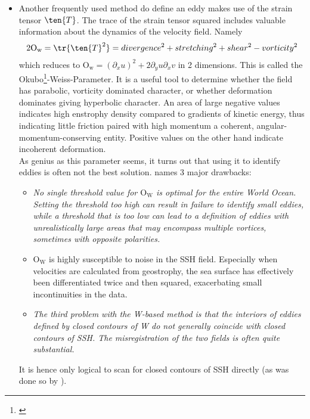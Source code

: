 \begin{itemize}
\item
Another frequently used method do define an eddy makes use of the strain tensor $\ten{T}$. The trace of the strain tensor squared includes
valuable information about the dynamics of the velocity field. Namely
\begin{equation}\begin{split}
	2\mathrm{O_w}=\tr{\ten{T}^2}
	=
	divergence^2
	+ stretching^2
	+ shear^2
	 - vorticity^2 \\
\end{split}\end{equation}
which reduces to $\mathrm{O_w}= \left(\partial_x u\right)^2+2 \partial_y u \partial_x v$ in 2 dimensions. This is called the
Okubo\footnote{\citet{Okubo1970}}-Weiss-Parameter. It is a useful tool to determine whether the field has parabolic, vorticity dominated character, or whether
deformation dominates giving hyperbolic character. An area of large negative values indicates high enstrophy density compared to gradients of kinetic energy,
thus indicating little friction paired with high momentum \ie a coherent, angular-momentum-conserving entity. Positive values on the other hand indicate
incoherent deformation.\\ As genius as this parameter seems, it turns out that using it to identify eddies is often not the best solution.
\citeauthor{Chelton2011} names 3 major drawbacks:
\begin{itemize}
	\item
	\textit{ No single threshold value for $\mathrm{O_W}$ is optimal for the entire World Ocean. Setting the threshold too high can result in failure to identify small eddies, while a threshold that is too low can lead to a definition of eddies with unrealistically large areas that may encompass multiple vortices, sometimes with opposite polarities. }
	\item
	$\mathrm{O_W}$ is highly susceptible to noise in the SSH field. Especially when velocities are calculated from geostrophy, the sea surface has effectively
been differentiated twice and then squared, exacerbating small incontinuities in the data.
	\item
	\textit{The third problem with the W-based method is that the interiors of eddies defined by closed contours of W do not generally coincide with closed contours of SSH. The misregistration of the two fields is often quite substantial. }
\end{itemize}
It is hence only logical to scan for closed contours of SSH directly (as was done so by \citeauthor{Chelton2011}).
\end{itemize}
